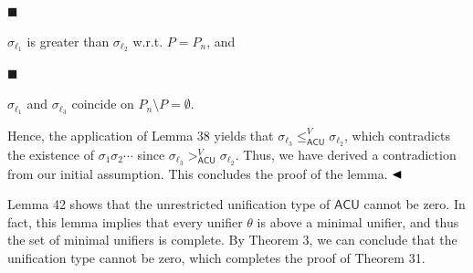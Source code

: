  
\par\noindent  $\blacksquare$ 
 
$\sigma_{\ell_{1}}$ is greater than $\sigma_{\ell_{2}}$ w.r.t. $P=P_{n}$, and\par
 
 
 
\par\noindent  $\blacksquare$ 
 
$\sigma_{\ell_{1}}$ and $\sigma_{\ell_{3}}$ coincide on $P_{n}\setminus P=\emptyset$.\par
 
 
  
Hence, the application of Lemma 38 yields that $\sigma_{\ell_{3}}\leq_{\mathsf{ACU}}^{V}\sigma_{\ell_{2}}$, which contradicts the existence of $\sigma_{1}\sigma_{2}\cdots$ since $\sigma_{\ell_{3}}>_{\mathsf{ACU}}^{V}\sigma_{\ell_{2}}$. Thus, we have derived a contradiction from our initial assumption. This concludes the proof of the lemma. $\hfill\blacktriangleleft$\par
 
 
 
Lemma 42 shows that the unrestricted unification type of $\mathsf{ACU}$ cannot be zero. In fact, this lemma implies that every unifier $\theta$ is above a minimal unifier, and thus the set of minimal unifiers is complete. By Theorem 3, we can conclude that the unification type cannot be zero, which completes the proof of Theorem 31.\par
 
 
 
\par
 
 
 
